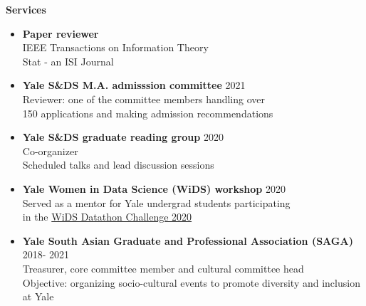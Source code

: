 \documentclass[letterpaper,11pt,oneside]{article}
\theoremstyle{definition}
\begin{document}
	
	\noindent \textbf{Services}
	\begin{itemize}
		\item[]
		{\bf Paper reviewer}\\
		IEEE Transactions on Information Theory\\
		Stat - an ISI Journal
		
		
		\item[] {\bf Yale S\&DS M.A. admisssion committee} \hfill 2021\\
		Reviewer: one of the committee members
		handling over\\ 150 applications
		and making admission recommendations
		
		\item[] {\bf Yale S\&DS graduate reading group} \hfill 2020\\
		Co-organizer\\
		Scheduled talks and lead discussion sessions
		
		\item[] {\bf Yale Women in Data Science (WiDS) workshop} \hfill 2020\\
		Served as a mentor for Yale undergrad students participating \\
		in the \href{https://www.widsconference.org/blog_archive/wids-datathon-2020-workshops-worldwide}{WiDS Datathon Challenge 2020}
		
		\item[] {\bf Yale South Asian Graduate and Professional Association (SAGA)} \hfill 2018- 2021\\
		Treasurer, core committee member and cultural committee head\\
		Objective: organizing socio-cultural events to promote diversity and inclusion at Yale
		
		
	\end{itemize}

	\clearpage
	
\end{document}
